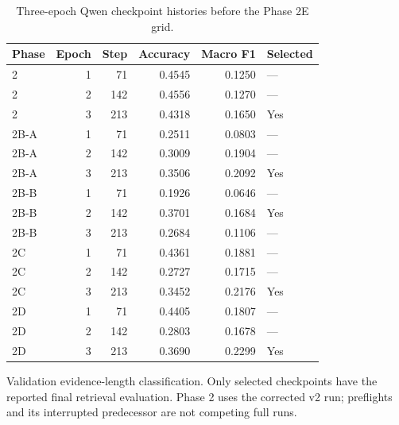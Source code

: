 \begin{table}[htbp]
\centering\small
\caption{Three-epoch Qwen checkpoint histories before the Phase 2E grid.}
\label{tab:qwencheckpoints}
\begin{tabular}{@{}lrrrrl@{}}
\toprule
Phase & Epoch & Step & Accuracy & Macro F1 & Selected\\
\midrule
2 & 1 & 71 & 0.4545 & 0.1250 & ---\\
2 & 2 & 142 & 0.4556 & 0.1270 & ---\\
2 & 3 & 213 & 0.4318 & 0.1650 & Yes\\
2B-A & 1 & 71 & 0.2511 & 0.0803 & ---\\
2B-A & 2 & 142 & 0.3009 & 0.1904 & ---\\
2B-A & 3 & 213 & 0.3506 & 0.2092 & Yes\\
2B-B & 1 & 71 & 0.1926 & 0.0646 & ---\\
2B-B & 2 & 142 & 0.3701 & 0.1684 & Yes\\
2B-B & 3 & 213 & 0.2684 & 0.1106 & ---\\
2C & 1 & 71 & 0.4361 & 0.1881 & ---\\
2C & 2 & 142 & 0.2727 & 0.1715 & ---\\
2C & 3 & 213 & 0.3452 & 0.2176 & Yes\\
2D & 1 & 71 & 0.4405 & 0.1807 & ---\\
2D & 2 & 142 & 0.2803 & 0.1678 & ---\\
2D & 3 & 213 & 0.3690 & 0.2299 & Yes\\
\bottomrule
\end{tabular}
\par\smallskip\begin{minipage}{\textwidth}\footnotesize Validation evidence-length classification. Only selected checkpoints have the reported final retrieval evaluation. Phase 2 uses the corrected v2 run; preflights and its interrupted predecessor are not competing full runs.\end{minipage}
\end{table}
